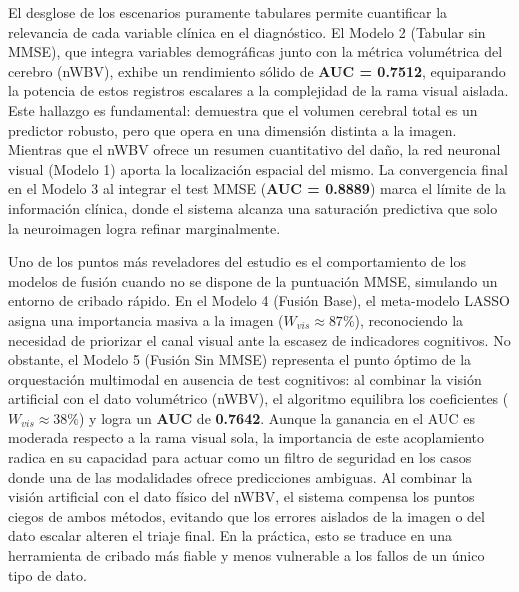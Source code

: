 \documentclass[12pt, oneside, english, spanish]{book}
\begin{document}
El desglose de los escenarios puramente tabulares permite cuantificar la relevancia de cada variable clínica en el diagnóstico. El Modelo 2 (Tabular sin MMSE), que integra variables demográficas junto con la métrica volumétrica del cerebro (nWBV), exhibe un rendimiento sólido de \textbf{AUC = 0.7512}, equiparando la potencia de estos registros escalares a la complejidad de la rama visual aislada. Este hallazgo es fundamental: demuestra que el volumen cerebral total es un predictor robusto, pero que opera en una dimensión distinta a la imagen. Mientras que el nWBV ofrece un resumen cuantitativo del daño, la red neuronal visual (Modelo 1) aporta la localización espacial del mismo. La convergencia final en el Modelo 3 al integrar el test MMSE (\textbf{AUC = 0.8889}) marca el límite de la información clínica, donde el sistema alcanza una saturación predictiva que solo la neuroimagen logra refinar marginalmente.

Uno de los puntos más reveladores del estudio es el comportamiento de los modelos de fusión cuando no se dispone de la puntuación MMSE, simulando un entorno de cribado rápido. En el Modelo 4 (Fusión Base), el meta-modelo LASSO asigna una importancia masiva a la imagen ($W_{vis} \approx 87\%$), reconociendo la necesidad de priorizar el canal visual ante la escasez de indicadores cognitivos. No obstante, el Modelo 5 (Fusión Sin MMSE) representa el punto óptimo de la orquestación multimodal en ausencia de test cognitivos: al combinar la visión artificial con el dato volumétrico (nWBV), el algoritmo equilibra los coeficientes ($W_{vis} \approx 38\%$) y logra un \textbf{AUC} de \textbf{0.7642}. Aunque la ganancia en el AUC es moderada respecto a la rama visual sola, la importancia de este acoplamiento radica en su capacidad para actuar como un filtro de seguridad en los casos donde una de las modalidades ofrece predicciones ambiguas. Al combinar la visión artificial con el dato físico del nWBV, el sistema compensa los puntos ciegos de ambos métodos, evitando que los errores aislados de la imagen o del dato escalar alteren el triaje final. En la práctica, esto se traduce en una herramienta de cribado más fiable y menos vulnerable a los fallos de un único tipo de dato.
\end{document}
